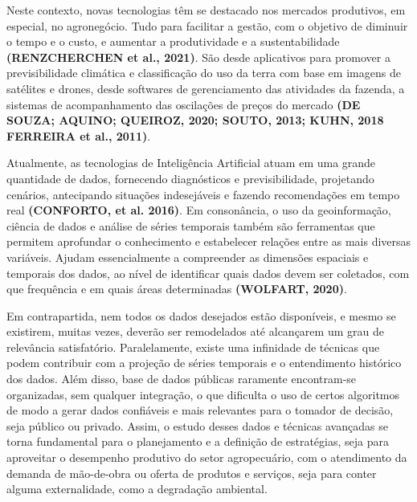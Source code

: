 Neste contexto, novas tecnologias têm se destacado nos mercados produtivos, em especial, no agronegócio. Tudo para facilitar a gestão, com o objetivo de diminuir o tempo e o custo, e aumentar a produtividade e a sustentabilidade \textbf{(RENZCHERCHEN et al., 2021)}. São desde aplicativos para promover a previsibilidade climática e classificação do uso da terra com base em imagens de satélites e drones, desde softwares de gerenciamento das atividades da fazenda, a sistemas de acompanhamento das oscilações de preços do mercado \textbf{(DE SOUZA; AQUINO; QUEIROZ, 2020; SOUTO, 2013; KUHN, 2018 FERREIRA et al., 2011)}.

Atualmente, as tecnologias de Inteligência Artificial atuam em uma grande quantidade de dados, fornecendo diagnósticos e previsibilidade, projetando cenários, antecipando situações indesejáveis e fazendo recomendações em tempo real \textbf{(CONFORTO, et al. 2016)}. Em consonância, o uso da geoinformação, ciência de dados e análise de séries temporais também são ferramentas que permitem aprofundar o conhecimento e estabelecer relações entre as mais diversas variáveis. Ajudam essencialmente a compreender as dimensões espaciais e temporais dos dados, ao nível de identificar quais dados devem ser coletados, com que frequência e em quais áreas determinadas \textbf{(WOLFART, 2020)}.

Em contrapartida, nem todos os dados desejados estão disponíveis, e mesmo se existirem, muitas vezes, deverão ser remodelados até alcançarem um grau de relevância satisfatório. Paralelamente, existe uma infinidade de técnicas que podem contribuir com a projeção de séries temporais e o entendimento histórico dos dados. Além disso, base de dados públicas raramente encontram-se organizadas, sem qualquer integração, o que dificulta o uso de certos algoritmos de modo a gerar dados confiáveis e mais relevantes para o tomador de decisão, seja público ou privado. Assim, o estudo desses dados e técnicas avançadas se torna fundamental para o planejamento e a definição de estratégias, seja para aproveitar o desempenho produtivo do setor agropecuário, com o atendimento da demanda de mão-de-obra ou oferta de produtos e serviços, seja para conter alguma
externalidade, como a degradação ambiental.